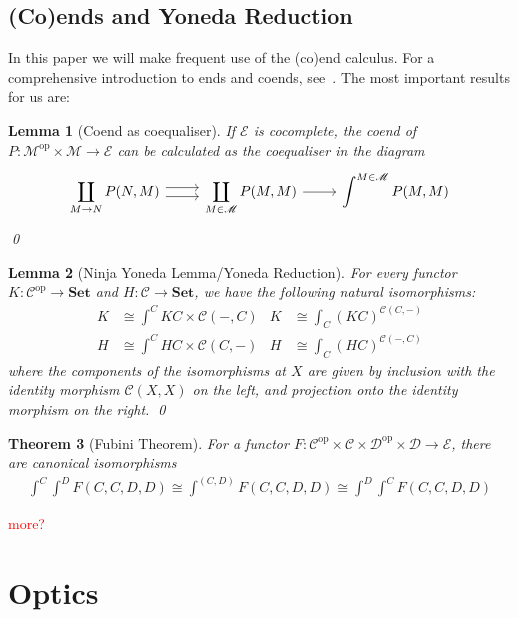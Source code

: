 \documentclass[11pt,a4paper]{article}
\theoremstyle{plain}
\newtheorem{theorem}{Theorem}[subsection]
\newtheorem{lemma}[theorem]{Lemma}
\theoremstyle{definition}
\newcommand{\C}{\mathscr{C}}
\newcommand{\D}{\mathscr{D}}
\newcommand{\E}{\mathscr{E}}
\newcommand{\M}{\mathscr{M}}
\newcommand{\Set}{\mathbf{Set}}
\newcommand{\op}{\mathrm{op}}
\newcommand{\todo}[1]{\textcolor{red}{\small #1}}
\begin{document}
\subsection{(Co)ends and Yoneda Reduction}

In this paper we will make frequent use of the (co)end calculus. For a comprehensive introduction to ends and coends, see~\cite{CoendCofriend}. The most important results for us are:

\begin{lemma}[Coend as coequaliser]\label{lemma:calculate-coend}
If $\E$ is cocomplete, the coend of $P : \M^\op \times \M \to \E$ can be calculated as the coequaliser in the diagram
\[
  \begin{tikzcd}
    \displaystyle \coprod_{M \to N} P(N, M) \ar[r,shift left=.75ex]  \ar[r,shift right=.75ex] & \displaystyle\coprod_{M \in \M} P(M, M) \ar[r] & \displaystyle\int^{M \in \M} P(M, M)
  \end{tikzcd}
\]
\qed
\end{lemma}

\begin{lemma}[Ninja Yoneda Lemma/Yoneda Reduction]
For every functor $K : \C^\op \to \Set$ and $H : \C \to \Set$, we have the following natural isomorphisms:
\begin{align*}
K &\cong \int^C KC \times \C(-,C) &
K &\cong \int_C (KC)^{\C(C,-)} \\
H &\cong \int^C HC \times \C(C,-)  &
H &\cong \int_C (HC)^{\C(-,C)}
\end{align*}
where the components of the isomorphisms at $X$ are given by inclusion with the identity morphism $\C(X, X)$ on the left, and projection onto the identity morphism on the right.
\qed
\end{lemma}

\begin{theorem}[Fubini Theorem]
For a functor $F : \C^\op \times \C \times \D^\op \times \D \to \E$, there are canonical isomorphisms
\begin{align*}
\int^C \int^D F(C,C,D,D) \cong \int^{(C,D)} F(C,C,D,D) \cong \int^D \int^C F(C,C,D,D)
\end{align*}
\end{theorem}

\todo{more?}

\section{Optics}\label{sec:optics}
\end{document}

